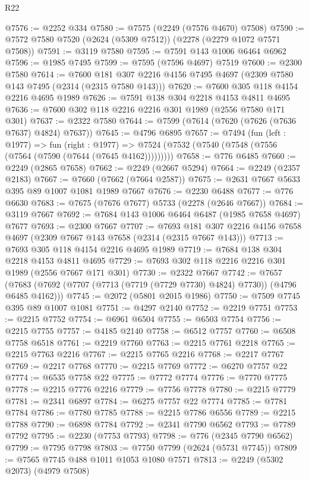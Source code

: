 \begin{lexlean}{R22}
\begin{coremodule}
@7576 := @2252 @334
@7580 := @7575 (@2249 (@7576 @4670) @7508)
@7590 := @7572 @7580 @7520 (@2624 (@5309 @7512)) (@2278 (@2279 @1072 @7571 @7508))
@7591 := @3119 @7580
@7595 := @7591 @143 @1006 @6464 @6962
@7596 := @1985 @7495
@7599 := @7595 (@7596 @4697) @7519
@7600 := @2300 @7580
@7614 := @7600 @181 @307 @2216 @4156 @7495 @4697 (@2309 @7580 @143 @7495 (@2314 (@2315 @7580 @143)))
@7620 := @7600 @305 @118 @4154 @2216 @4695 @1989
@7626 := @7591 @138 @304 @2218 @4153 @4811 @4695
@7636 := @7600 @302 @118 @2216 @2216 @301 @1989 (@2556 @7580 @171 @301)
@7637 := @2322 @7580
@7644 := @7599 (@7614 (@7620 (@7626 (@7636 @7637) @4824) @7637))
@7645 := @4796 @6895
@7657 := @7494
    (fun (left : @1977) =>
    fun (right : @1977) =>
    @7524 (@7532 (@7540 (@7548 (@7556 (@7564 (@7590 (@7644 (@7645 @4162)))))))))
@7658 := @776 @6485
@7660 := @2249 (@2865 @7658)
@7662 := @2249 (@2667 @5294)
@7664 := @2249 (@2357 @2183)
@7667 := @7660 (@7662 (@7664 @2587))
@7675 := @2631 @7667 @5633 @395 @89 @1007 @1081 @1989 @7667
@7676 := @2230 @6488
@7677 := @776 @6630
@7683 := @7675 (@7676 @7677) @5733 (@2278 (@2646 @7667))
@7684 := @3119 @7667
@7692 := @7684 @143 @1006 @6464 @6487 (@1985 @7658 @4697) @7677
@7693 := @2300 @7667
@7707 := @7693 @181 @307 @2216 @4156 @7658 @4697 (@2309 @7667 @143 @7658 (@2314 (@2315 @7667 @143)))
@7713 := @7693 @305 @118 @4154 @2216 @4695 @1989
@7719 := @7684 @138 @304 @2218 @4153 @4811 @4695
@7729 := @7693 @302 @118 @2216 @2216 @301 @1989 (@2556 @7667 @171 @301)
@7730 := @2322 @7667
@7742 := @7657 (@7683 (@7692 (@7707 (@7713 (@7719 (@7729 @7730) @4824) @7730)) (@4796 @6485 @4162)))
@7745 := @2072 (@5801 @2015 @1986)
@7750 := @7509 @7745 @395 @89 @1007 @1081
@7751 := @4297 @2140
@7752 := @2219 @7751
@7753 := @2215 @7752
@7754 := @6961 @6504
@7755 := @6503 @7754
@7756 := @2215 @7755
@7757 := @4185 @2140
@7758 := @6512 @7757
@7760 := @6508 @7758 @6518
@7761 := @2219 @7760
@7763 := @2215 @7761 @2218
@7765 := @2215 @7763 @2216
@7767 := @2215 @7765 @2216
@7768 := @2217 @7767
@7769 := @2217 @7768
@7770 := @2215 @7769
@7772 := @6270 @7757 @22
@7774 := @6535 @7758 @22
@7775 := @7772 @7774
@7776 := @7770 @7775
@7778 := @2215 @7776 @2216
@7779 := @7756 @7778
@7780 := @2215 @7779
@7781 := @2341 @6897
@7784 := @6275 @7757 @22 @7774
@7785 := @7781 @7784
@7786 := @7780 @7785
@7788 := @2215 @7786 @6556
@7789 := @2215 @7788
@7790 := @6898 @7784
@7792 := @2341 @7790 @6562
@7793 := @7789 @7792
@7795 := @2230 (@7753 @7793)
@7798 := @776 (@2345 @7790 @6562)
@7799 := @7795 @7798
@7803 := @7750 @7799 (@2624 (@5731 @7745))
@7809 := @7565 @7745 @488 @1011 @1053 @1080 @7571
@7813 := @2249 (@5302 @2073) (@4979 @7508)

\end{coremodule}
\end{lexlean}
